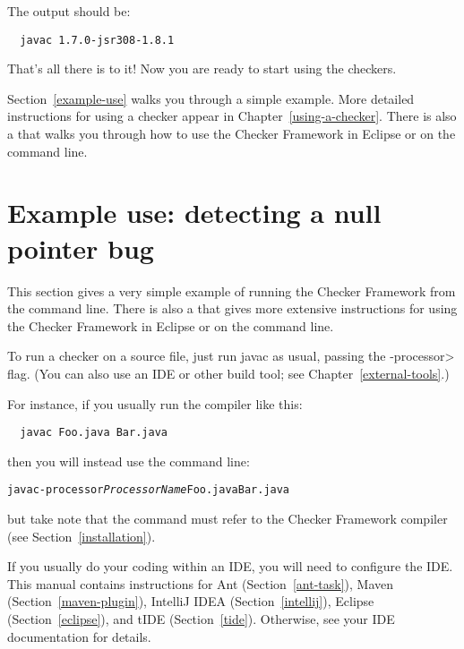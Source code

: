The output should be:

\begin{Verbatim}
  javac 1.7.0-jsr308-1.8.1
\end{Verbatim}

That's all there is to it!  Now you are ready to start using the checkers.

Section~\ref{example-use} walks you through a simple example.  More detailed
instructions for using a checker appear in Chapter~\ref{using-a-checker}.
There is also a 
that walks you through how to use the Checker Framework in Eclipse or on
the command line.


\section{Example use:  detecting a null pointer bug\label{example-use}}

This section gives a very simple example of running the Checker Framework
from the command line.  There is also a 
that gives more extensive instructions for using the Checker Framework in
Eclipse or on the command line.


To run a checker on a source file, just run javac as usual, passing the
\<-processor> flag.  (You can also use an IDE or other build tool; see
Chapter~\ref{external-tools}.)

For instance, if you usually run the compiler like
this:

\begin{Verbatim}
  javac Foo.java Bar.java
\end{Verbatim}

\noindent
then you will instead use the command line:

\begin{alltt}
  javac -processor \textit{ProcessorName} Foo.java Bar.java
\end{alltt}

\noindent
but take note that the  command must refer to the
Checker Framework compiler (see Section~\ref{installation}).


If you usually do your coding within an IDE, you will need to configure
the IDE.  This manual contains instructions for
Ant (Section~\ref{ant-task}),
Maven (Section~\ref{maven-plugin}),
IntelliJ IDEA (Section~\ref{intellij}),
Eclipse (Section~\ref{eclipse}), and
tIDE (Section~\ref{tide}).
Otherwise, see your IDE documentation for details.


